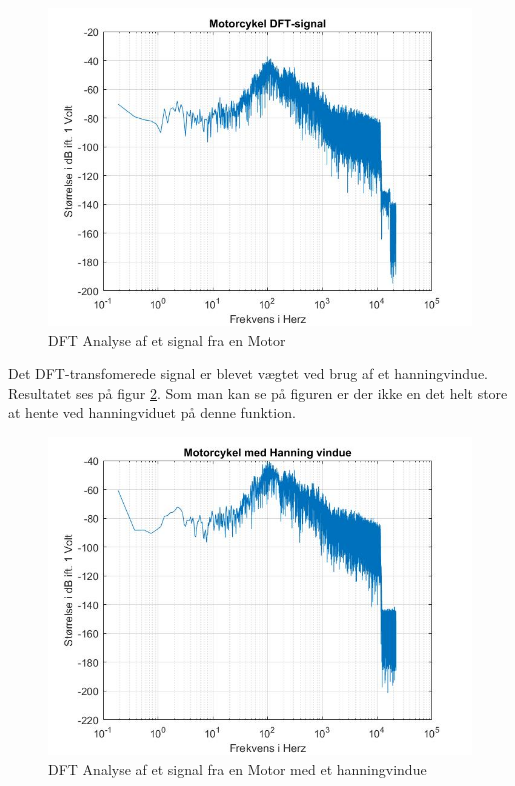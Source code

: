 \begin{figure}[H]
	\centering
	\includegraphics[width=140mm]{figures/Motor/DFT.jpg}
	\caption{DFT Analyse af et signal fra en Motor}
	\label{fig:Motor DFT}
\end{figure}

Det DFT-transfomerede signal er blevet vægtet ved brug af et hanningvindue. Resultatet ses på figur \ref{fig:Motor hanning}. Som man kan se på figuren er der ikke en det helt store at hente ved hanningviduet på denne funktion.
\begin{figure}[H]
	\centering
	\includegraphics[width=140mm]{figures/Motor/hanning.jpg}
	\caption{DFT Analyse af et signal fra en Motor med et hanningvindue}
	\label{fig:Motor hanning}
\end{figure}

